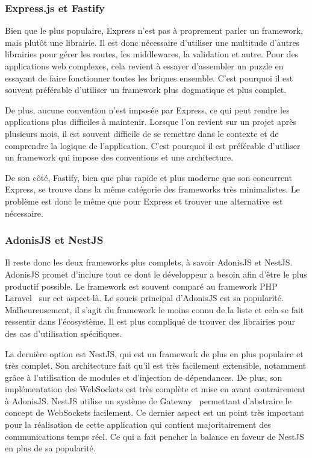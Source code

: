 \subsubsection{Express.js et Fastify}

Bien que le plus populaire, Express n'est pas à proprement parler un framework, mais plutôt une librairie. Il est donc nécessaire d'utiliser une multitude d'autres librairies pour gérer les routes, les middlewares, la validation et autre. Pour des applications web complexes, cela revient à essayer d'assembler un puzzle en essayant de faire fonctionner toutes les briques ensemble. C'est pourquoi il est souvent préférable d'utiliser un framework plus dogmatique et plus complet.

De plus, aucune convention n'est imposée par Express, ce qui peut rendre les applications plus difficiles à maintenir. Lorsque l'on revient sur un projet après plusieurs mois, il est souvent difficile de se remettre dans le contexte et de comprendre la logique de l'application. C'est pourquoi il est préférable d'utiliser un framework qui impose des conventions et une architecture.

De son côté, Fastify, bien que plus rapide et plus moderne que son concurrent Express, se trouve dans la même catégorie des frameworks très minimalistes. Le problème est donc le même que pour Express et trouver une alternative est nécessaire.

\subsubsection{AdonisJS et NestJS}

Il reste donc les deux frameworks plus complets, à savoir AdonisJS et NestJS. AdonisJS promet d'inclure tout ce dont le développeur a besoin afin d'être le plus productif possible. Le framework est souvent comparé au framework PHP Laravel~\cite{laravel} sur cet aspect-là. Le soucis principal d'AdonisJS est sa popularité. Malheureusement, il s'agit du framework le moins connu de la liste et cela se fait ressentir dans l'écosystème. Il est plus compliqué de trouver des librairies pour des cas d'utilisation spécifiques.

La dernière option est NestJS, qui est un framework de plus en plus populaire et très complet. Son architecture fait qu'il est très facilement extensible, notamment grâce à l'utilisation de modules et d'injection de dépendances. De plus, son implémentation des WebSockets est très complète et mise en avant contrairement à AdonisJS. NestJS utilise un système de Gateway~\cite{nestjs-gateway} permettant d'abstraire le concept de WebSockets facilement.  Ce dernier aspect est un point très important pour la réalisation de cette application qui contient majoritairement des communications temps réel. Ce qui a fait pencher la balance en faveur de NestJS en plus de sa popularité.

